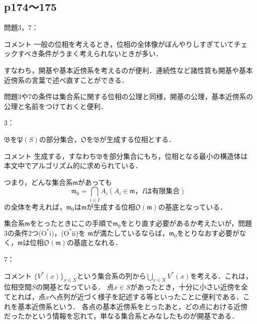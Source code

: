 \documentclass[dvipdfmx,uplatex,11pt]{jsarticle}
\begin{document}
\subsection{p174〜175}

問題3，7：
\begin{itembox}[c]{コメント}
一般の位相を考えるとき，位相の全体像がぼんやりしすぎていてチェックすべき条件がうまく考えられないときが多い．

すなわち，開基や基本近傍系を考えるのが便利．連続性など諸性質も開基や基本近傍系の言葉で述べ直すことができる．

問題3や7の条件は集合系に関する位相の公理と同様，開基の公理，基本近傍系の公理と名前をつけておくと便利．
\end{itembox}

3：

$\mathfrak{B}$を$\mathfrak{P}(S)$の部分集合，$\mathfrak{O}$を$\mathfrak{B}$が生成する位相とする．
\begin{itembox}[c]{コメント}
    生成する，すなわち$\mathfrak{B}$を部分集合にもち，位相となる最小の構造体は本文中でアルゴリズム的に求められている．
    
    つまり，どんな集合系$\mathfrak{m}$があっても
    \[
        \mathfrak{m}_0 = \bigcap_{i \in I} A_i (A_i \in \mathfrak{m}，I \text{は有限集合})
    \]
    の全体を考えれば，$\mathfrak{m}_0$は$\mathfrak{m}$が生成する位相$\mathfrak{O}(\mathfrak{m})$の基底となっている．

    集合系$\mathfrak{m}$をとったときにこの手順で$\mathfrak{m}_0$をとり直す必要があるか考えたいが，問題3の条件2つ($\mathrm{O}^{\ast} \mathrm{i}$)，($\mathrm{O}^{\ast} \mathrm{ii}$)を
    $\mathfrak{m}$が満たしているならば，$\mathfrak{m}_0$をとりなおす必要がなく，$\mathfrak{m}$は位相$\mathfrak{O}(\mathfrak{m})$の基底となれる．
\end{itembox}
7：
\begin{itembox}[c]{コメント}
    $\{ V^{*} (x)\}_{x \in X}$という集合系の列から$\bigcup_{x \in X} V^{*} (x)$を考える．これは，位相空間$S$の開基となっている．
    点$x \in S$があったとき，十分に小さい近傍を全てとれば，点$x$へ点列が近づく様子を記述する等といったことに便利である．これを基本近傍系という．
    各点の基本近傍系をとったあと，どの点における近傍だったかという情報を忘れて，単なる集合系とみなしたものが開基である．
\end{itembox}
\end{document}
